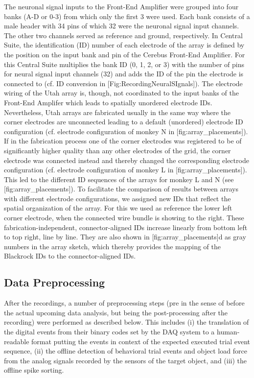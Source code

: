 The neuronal signal inputs to the Front-End Amplifier were grouped into four banks (A-D or 0-3) from which only the first 3 were used. Each bank consists of a male header with 34 pins of which 32 were the neuronal signal input channels. The other two channels served as reference and ground, respectively. In Central Suite, the identification (ID) number of each electrode of the array is defined by the position on the input bank and pin of the Cerebus Front-End Amplifier. For this Central Suite multiplies the bank ID (0, 1, 2, or 3) with the number of pins for neural signal input channels (32) and adds the ID of the pin the electrode is connected to (cf. ID conversion in [Fig:RecordingNeuralSIgnals]). The electrode wiring of the Utah array is, though, not coordinated to the input banks of the Front-End Amplifer which leads to spatially unordered electrode IDs. Nevertheless, Utah arrays are fabricated usually in the same way where the corner electrodes are unconnected leading to a default (unordered) electrode ID configuration (cf. electrode configuration of monkey N in [fig:array\_placements]). If in the fabrication process one of the corner electrodes was registered to be of significantly higher quality than any other electrodes of the grid, the corner electrode was connected instead and thereby changed the corresponding electrode configuration (cf. electrode configuration of monkey L in [fig:array\_placements]). This led to the different ID sequences of the arrays for monkey L and N (see [fig:array\_placements]). To facilitate the comparison of results between arrays with different electrode configurations, we assigned new IDs that reflect the spatial organization of the array. For this we used as reference the lower left corner electrode, when the connected wire bundle is showing to the right. These fabrication-independent, connector-aligned IDs increase linearly from bottom left to top right, line by line. They are also shown in [fig:array\_placements]d as gray numbers in the array sketch, which thereby provides the mapping of the Blackrock IDs to the connector-aligned IDs. 





\subsection{Data Preprocessing}

After the recordings, a number of preprocessing steps (pre in the sense of before the actual upcoming data analysis, but being the post-processing after the recording) were performed as described below. This includes (i) the translation of the digital events from their binary codes set by the DAQ system to a human-readable format putting the events in context of the expected executed trial event sequence, (ii) the offline detection of behavioral trial events and object load force from the analog signals recorded by the sensors of the target object, and (iii) the offline spike sorting.

